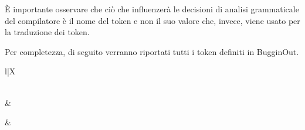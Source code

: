 \`E importante osservare che ci\`o che influenzer\`a le decisioni di analisi grammaticale del compilatore \`e il nome del token e non il suo valore che, invece, viene usato per la traduzione dei token.

Per completezza, di seguito verranno riportati tutti i token definiti in BugginOut.
\begin{xltabular}{\textwidth}{l|X}
	\caption{Token di BugginOut}
	\label{fig:bugginout-complete-tokens} \\

	\hline
	\hline
	 &  \\
	\hline
	\endfirsthead

	\hline
	 &  \\
	\hline
	\endhead

	\endfoot

	\hline
	\hline
	\endlastfoot


\end{xltabular}
